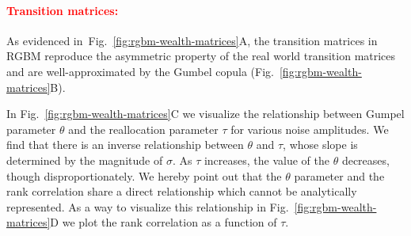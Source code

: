 \documentclass[11pt]{article}
\newcommand{\fref}[1]{Fig.~\ref{fig:#1}}
\numberwithin{equation}{section}
\begin{document}

\textcolor{red}{\paragraph{Transition matrices:}} As evidenced in~\fref{rgbm-wealth-matrices}A, the transition matrices in RGBM reproduce the asymmetric property of the real world transition matrices and are well-approximated by the Gumbel copula (\fref{rgbm-wealth-matrices}B). %

In \fref{rgbm-wealth-matrices}C we visualize the relationship between Gumpel parameter $\theta$ and the reallocation parameter $\tau$ for various noise amplitudes. We find that there is an inverse relationship between $\theta$ and $\tau$, whose slope is determined by the magnitude of $\sigma$. As $\tau$ increases, the value of the $\theta$ decreases, though disproportionately. We hereby point out that the $\theta$ parameter and the rank correlation share a direct relationship which cannot be analytically represented. As a way to visualize this relationship in \fref{rgbm-wealth-matrices}D we plot the rank correlation as a function of $\tau$.
\end{document}
